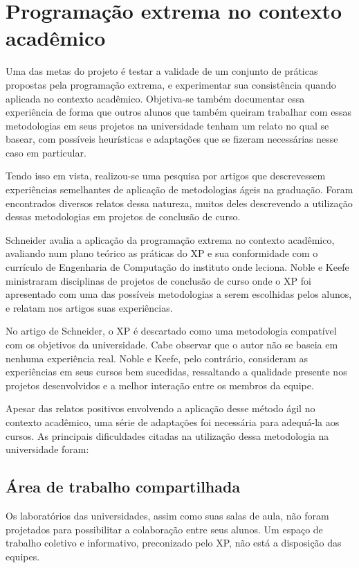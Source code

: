 \documentclass[a4paper,12pt,font=plain,header=plain]{abnt}
\begin{document}
	\section{Programação extrema no contexto acadêmico}
	Uma das metas do projeto é testar a validade de um conjunto de práticas propostas pela programação extrema, e experimentar sua consistência quando aplicada no contexto acadêmico. Objetiva-se também documentar essa experiência de forma que outros alunos que também queiram trabalhar com essas metodologias em seus projetos na universidade tenham um relato no qual se basear, com possíveis heurísticas e adaptações que se fizeram necessárias nesse caso em particular.

	Tendo isso em vista, realizou-se uma pesquisa por artigos que descrevessem experiências semelhantes de aplicação de metodologias ágeis na graduação. Foram encontrados diversos relatos dessa natureza, muitos deles descrevendo a utilização dessas metodologias em projetos de conclusão de curso.

	Schneider\cite{schneider03} avalia a aplicação da programação extrema no contexto acadêmico, avaliando num plano teórico as práticas do XP e sua conformidade com o currículo de Engenharia de Computação do instituto onde leciona. Noble\cite{noble04} e Keefe\cite{keefe04} ministraram disciplinas de projetos de conclusão de curso onde o XP foi apresentado com uma das possíveis metodologias a serem escolhidas pelos alunos, e relatam nos artigos suas experiências.

	No artigo de Schneider, o XP é descartado como uma metodologia compatível com os objetivos da universidade. Cabe observar que o autor não se baseia em nenhuma experiência real. Noble e Keefe, pelo contrário, consideram as experiências em seus cursos bem sucedidas, ressaltando a qualidade presente nos projetos desenvolvidos e a melhor interação entre os membros da equipe.

	Apesar das relatos positivos envolvendo a aplicação desse método ágil no contexto acadêmico, uma série de adaptações foi necessária para adequá-la aos cursos. As principais dificuldades citadas na utilização dessa metodologia na universidade foram:

	\subsection{Área de trabalho compartilhada}
		Os laboratórios das universidades, assim como suas salas de aula, não foram projetados para possibilitar a colaboração entre seus alunos. Um espaço de trabalho coletivo e informativo, preconizado pelo XP, não está a disposição das equipes.
\end{document}
